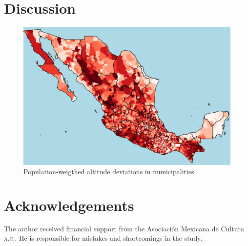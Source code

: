 \documentclass[letter,12pt]{article}
\begin{document}
\section{Discussion}

\begin{figure}
  \centering
    \caption{Population-weigthed altitude deviations in municipalities}\label{F:avgMg}
    \includegraphics[width=.8\columnwidth]{../plots/map.png}
\end{figure}


\section*{Acknowledgements}
The author received financial support from the Asociaci\'on Mexicana de Cultura \textsc{a.c.}. He is responsible for mistakes and shortcomings in the study.



%

\end{document}
